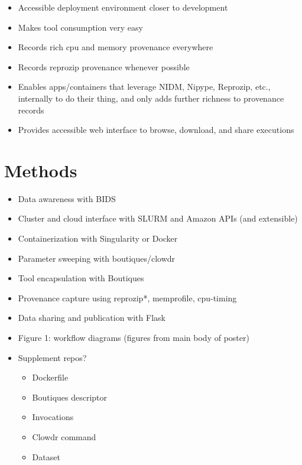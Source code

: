 \documentclass[9pt,twocolumn,twoside]{pnas-new}
\begin{document}
\begin{itemize}
\begin{itemize}
\item Accessible deployment environment closer to development
\item Makes tool consumption very easy
\item Records rich cpu and memory provenance everywhere
\item Records reprozip provenance whenever possible
\item Enables apps/containers that leverage NIDM, Nipype, Reprozip, etc., internally to do their thing, and only adds further richness to provenance records
\item Provides accessible web interface to browse, download, and share executions
\end{itemize}
\end{itemize}

\section*{Methods}
\begin{itemize}
\item Data awareness with BIDS
\item Cluster and cloud interface with SLURM and Amazon APIs (and extensible)
\item Containerization with Singularity or Docker
\item Parameter sweeping with boutiques/clowdr
\item Tool encapsulation with Boutiques
\item Provenance capture using reprozip*, memprofile, cpu-timing
\item Data sharing and publication with Flask
\item Figure 1: workflow diagrams (figures from main body of poster)
\item Supplement repos?
\begin{itemize}
\item Dockerfile
\item Boutiques descriptor
\item Invocations
\item Clowdr command
\item Dataset
\end{itemize}
\end{itemize}
\end{document}
